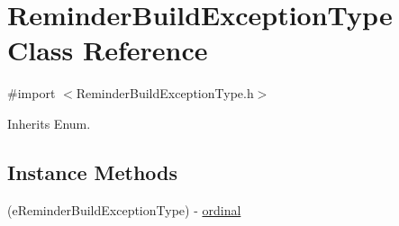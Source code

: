 \hypertarget{interface_reminder_build_exception_type}{}\section{Reminder\+Build\+Exception\+Type Class Reference}
\label{interface_reminder_build_exception_type}


{\ttfamily \#import $<$Reminder\+Build\+Exception\+Type.\+h$>$}



Inherits Enum.

\subsection*{Instance Methods}
\begin{DoxyCompactItemize}
\item 
(e\+Reminder\+Build\+Exception\+Type) -\/ \hyperlink{interface_reminder_build_exception_type_acde0a9e1844d88943bbb70eba921e29b}{ordinal}
\end{DoxyCompactItemize}
